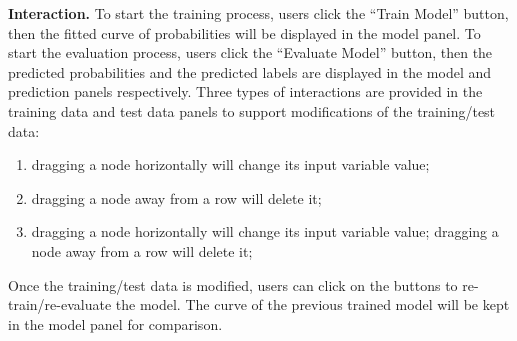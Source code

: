 \textbf{Interaction.} To start the training process, users click the “Train Model” button, then the fitted curve of probabilities will be displayed in the model panel. To start the evaluation process, users click the “Evaluate Model” button, then the predicted probabilities and the predicted labels are displayed in the model and prediction panels respectively. 
Three types of interactions are provided in the training data and test data panels to support modifications of the training/test data: 
\begin{enumerate}
    \item dragging a node horizontally will change its input variable value; 
    \item dragging a node away from a row will delete it;
    \item dragging a node horizontally will change its input variable value; dragging a node away from a row will delete it;
\end{enumerate}
Once the training/test data is modified, users can click on the buttons to re-train/re-evaluate the model. The curve of the previous trained model will be kept in the model panel for comparison.
